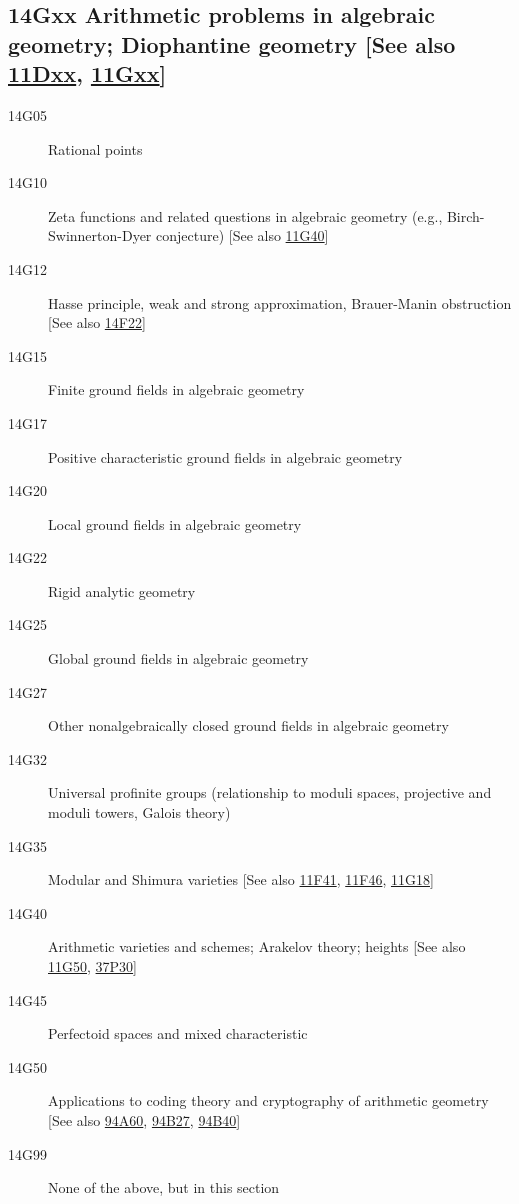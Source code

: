 \documentclass[letterpaper]{article}
\begin{document}
\subsection*{14Gxx Arithmetic problems in algebraic geometry; Diophantine geometry [See also \hyperref[11Dxx]{11Dxx}, \hyperref[11Gxx]{11Gxx}] }\label{14Gxx}
\begin{description}
\item [14G05]\label{14G05} Rational points
\item [14G10]\label{14G10} Zeta functions and related questions in algebraic geometry (e.g., Birch-Swinnerton-Dyer conjecture) [See also \hyperref[11G40]{11G40}]
\item [14G12]\label{14G12} Hasse principle, weak and strong approximation, Brauer-Manin obstruction [See also \hyperref[14F22]{14F22}]
\item [14G15]\label{14G15} Finite ground fields in algebraic geometry
\item [14G17]\label{14G17} Positive characteristic ground fields in algebraic geometry
\item [14G20]\label{14G20} Local ground fields in algebraic geometry
\item [14G22]\label{14G22} Rigid analytic geometry
\item [14G25]\label{14G25} Global ground fields in algebraic geometry
\item [14G27]\label{14G27} Other nonalgebraically closed ground fields in algebraic geometry
\item [14G32]\label{14G32} Universal profinite groups (relationship to moduli spaces, projective and moduli towers, Galois theory)
\item [14G35]\label{14G35} Modular and Shimura varieties [See also \hyperref[11F41]{11F41}, \hyperref[11F46]{11F46}, \hyperref[11G18]{11G18}]
\item [14G40]\label{14G40} Arithmetic varieties and schemes; Arakelov theory; heights [See also \hyperref[11G50]{11G50}, \hyperref[37P30]{37P30}]
\item [14G45]\label{14G45} Perfectoid spaces and mixed characteristic
\item [14G50]\label{14G50} Applications to coding theory and cryptography of arithmetic geometry [See also \hyperref[94A60]{94A60}, \hyperref[94B27]{94B27}, \hyperref[94B40]{94B40}]
\item [14G99]\label{14G99} None of the above, but in this section
\end{description}          
\end{document}
